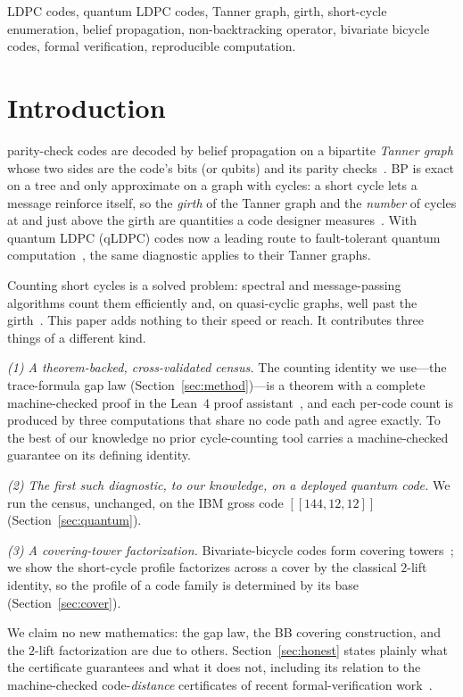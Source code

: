 \documentclass[journal]{IEEEtran}
\begin{document}
\begin{IEEEkeywords}
LDPC codes, quantum LDPC codes, Tanner graph, girth, short-cycle enumeration, belief
propagation, non-backtracking operator, bivariate bicycle codes, formal verification,
reproducible computation.
\end{IEEEkeywords}

\section{Introduction}
 parity-check codes are decoded by belief propagation on a
bipartite \emph{Tanner graph} whose two sides are the code's bits (or qubits) and its parity
checks~\cite{Gallager,Tanner}. BP is exact on a tree and only approximate on a graph with
cycles: a short cycle lets a message reinforce itself, so the \emph{girth} of the Tanner graph
and the \emph{number} of cycles at and just above the girth are quantities a code designer
measures~\cite{Karimi}. With quantum LDPC (qLDPC) codes now a leading route to fault-tolerant
quantum computation~\cite{Bravyi}, the same diagnostic applies to their Tanner graphs.

Counting short cycles is a solved problem: spectral and message-passing algorithms count them
efficiently and, on quasi-cyclic graphs, well past the girth~\cite{Karimi,Blake}. This paper
adds nothing to their speed or reach. It contributes three things of a different kind.

\emph{(1) A theorem-backed, cross-validated census.} The counting identity we use---the
trace-formula gap law (Section~\ref{sec:method})---is a theorem with a complete machine-checked
proof in the Lean~4 proof assistant~\cite{PartVI}, and each per-code count is produced by three
computations that share no code path and agree exactly. To the best of our knowledge no prior
cycle-counting tool carries a machine-checked guarantee on its defining identity.

\emph{(2) The first such diagnostic, to our knowledge, on a deployed quantum code.} We run the census, unchanged,
on the IBM gross code $[[144,12,12]]$~\cite{Bravyi} (Section~\ref{sec:quantum}).

\emph{(3) A covering-tower factorization.} Bivariate-bicycle codes form covering
towers~\cite{Symons}; we show the short-cycle profile factorizes across a cover by the
classical $2$-lift identity, so the profile of a code family is determined by its base
(Section~\ref{sec:cover}).

We claim no new mathematics: the gap law, the BB covering construction, and the $2$-lift
factorization are due to others. Section~\ref{sec:honest} states plainly what the certificate
guarantees and what it does not, including its relation to the machine-checked code-\emph{distance}
certificates of recent formal-verification work~\cite{LeanQEC}.
\end{document}
